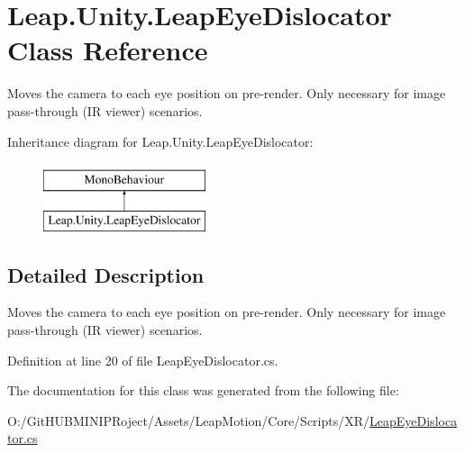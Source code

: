 \hypertarget{class_leap_1_1_unity_1_1_leap_eye_dislocator}{}\section{Leap.\+Unity.\+Leap\+Eye\+Dislocator Class Reference}
\label{class_leap_1_1_unity_1_1_leap_eye_dislocator}


Moves the camera to each eye position on pre-\/render. Only necessary for image pass-\/through (IR viewer) scenarios.  


Inheritance diagram for Leap.\+Unity.\+Leap\+Eye\+Dislocator\+:\begin{figure}[H]
\begin{center}
\leavevmode
\includegraphics[height=2.000000cm]{class_leap_1_1_unity_1_1_leap_eye_dislocator}
\end{center}
\end{figure}


\subsection{Detailed Description}
Moves the camera to each eye position on pre-\/render. Only necessary for image pass-\/through (IR viewer) scenarios. 



Definition at line 20 of file Leap\+Eye\+Dislocator.\+cs.



The documentation for this class was generated from the following file\+:\begin{DoxyCompactItemize}
\item 
O\+:/\+Git\+H\+U\+B\+M\+I\+N\+I\+P\+Roject/\+Assets/\+Leap\+Motion/\+Core/\+Scripts/\+X\+R/\mbox{\hyperlink{_leap_eye_dislocator_8cs}{Leap\+Eye\+Dislocator.\+cs}}\end{DoxyCompactItemize}
